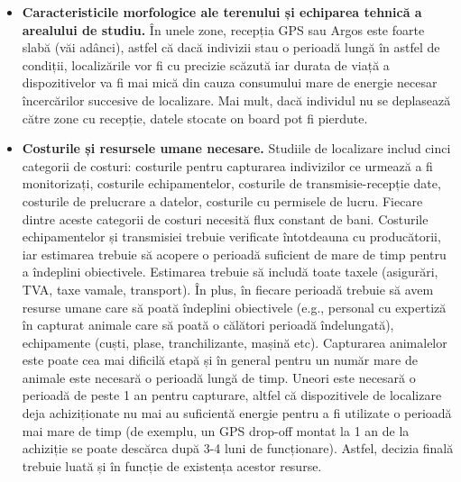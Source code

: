 \documentclass[11pt,onehalfspacing]{elife}
\begin{document}
\begin{itemize}
\item \textbf{Caracteristicile morfologice ale terenului și echiparea tehnică a arealului de studiu.} În unele zone, recepția GPS sau Argos este foarte slabă (văi adânci), astfel că dacă indivizii stau o perioadă lungă în astfel de condiții, localizările vor fi cu precizie scăzută iar durata de viață a dispozitivelor va fi mai mică din cauza consumului mare de energie necesar încercărilor succesive de localizare. Mai mult, dacă individul nu se deplasează către zone cu recepție, datele stocate on board pot fi pierdute.\\
 \item \textbf{Costurile și resursele umane necesare.} Studiile de localizare includ cinci categorii de costuri: costurile pentru capturarea indivizilor ce urmează a fi monitorizați, costurile echipamentelor, costurile de transmisie-recepție date, costurile de prelucrare a datelor, costurile cu permisele de lucru. Fiecare dintre aceste categorii de costuri necesită flux constant de bani. Costurile echipamentelor și transmisiei trebuie verificate întotdeauna cu producătorii, iar estimarea trebuie să acopere o perioadă suficient de mare de timp pentru a îndeplini obiectivele. Estimarea trebuie să includă toate taxele (asigurări, TVA, taxe vamale, transport). În plus, în fiecare perioadă trebuie să avem resurse umane care să poată îndeplini obiectivele (e.g., personal cu expertiză în capturat animale care să poată o călători perioadă îndelungată), echipamente (cuști, plase, tranchilizante, mașină etc). Capturarea animalelor este poate cea mai dificilă etapă și în general pentru un număr mare de animale este necesară o perioadă lungă de timp. Uneori este necesară o perioadă de peste 1 an pentru capturare, altfel că dispozitivele de localizare deja achiziționate nu mai au suficientă energie pentru a fi utilizate o perioadă mai mare de timp (de exemplu, un GPS drop-off montat la 1 an de la achiziție se poate descărca după 3-4 luni de funcționare). Astfel, decizia finală trebuie luată și în funcție de existența acestor resurse.
\end{itemize}
\end{document}
